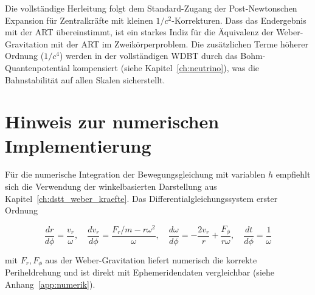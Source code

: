 Die vollständige Herleitung folgt dem Standard-Zugang der 
Post-Newtonschen Expansion für Zentralkräfte mit kleinen 
\( 1/c^2 \)-Korrekturen. Dass das Endergebnis mit der ART 
übereinstimmt, ist ein starkes Indiz für die Äquivalenz der 
Weber-Gravitation mit der ART im Zweikörperproblem. 
Die zusätzlichen Terme höherer Ordnung (\( 1/c^4 \)) werden in 
der vollständigen WDBT durch das Bohm-Quantenpotential 
kompensiert (siehe Kapitel~\ref{ch:neutrino}), was die Bahnstabilität 
auf allen Skalen sicherstellt.

\section*{Hinweis zur numerischen Implementierung}

Für die numerische Integration der Bewegungsgleichung mit variablen \( h \) 
empfiehlt sich die Verwendung der winkelbasierten Darstellung aus 
Kapitel~\ref{ch:dstt_weber_kraefte}. Das Differentialgleichungssystem erster Ordnung

\[
\frac{dr}{d\phi} = \frac{v_r}{\omega}, \quad
\frac{dv_r}{d\phi} = \frac{F_r/m - r\omega^2}{\omega}, \quad
\frac{d\omega}{d\phi} = -\frac{2v_r}{r} + \frac{F_\phi}{r\omega}, \quad
\frac{dt}{d\phi} = \frac{1}{\omega}
\]

mit \( F_r, F_\phi \) aus der Weber-Gravitation liefert numerisch 
die korrekte Periheldrehung und ist direkt mit Ephemeridendaten 
vergleichbar (siehe Anhang~\ref{app:numerik}).